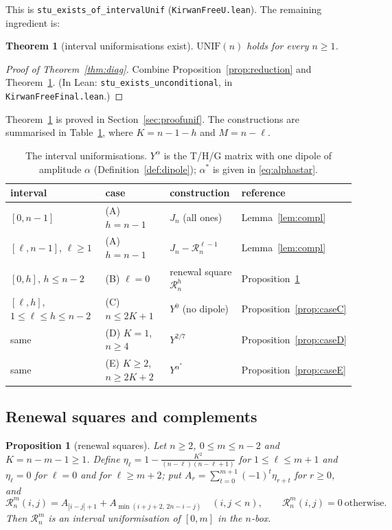 \documentclass[11pt]{amsart}
\newtheorem{mainthm}{Theorem}
\newtheorem{proposition}[lemma]{Proposition}
\theoremstyle{definition}
\theoremstyle{remark}
\numberwithin{equation}{section}
\newcommand{\cR}{\mathcal{R}}
\newcommand{\lean}[1]{\texttt{#1}}
\begin{document}
This is \lean{stu\_exists\_of\_intervalUnif} (\lean{KirwanFreeU.lean}). The remaining ingredient is:

\begin{mainthm}[interval uniformisations exist]\label{thm:unif}
$\mathrm{UNIF}(n)$ holds for every $n\ge1$.
\end{mainthm}

\begin{proof}[Proof of Theorem~\ref{thm:diag}]
Combine Proposition~\ref{prop:reduction} and Theorem~\ref{thm:unif}. (In Lean:
\lean{stu\_exists\_unconditional}, in \lean{KirwanFreeFinal.lean}.)
\end{proof}

Theorem~\ref{thm:unif} is proved in Section~\ref{sec:proofunif}. The constructions are summarised in
Table~\ref{tab:cases}, where $K=n-1-h$ and $M=n-\ell$.

\begin{table}[ht]
\centering
\begin{tabular}{llll}
\toprule
interval & case & construction & reference\\
\midrule
$[0,n-1]$ & (A) $h=n-1$ & $J_n$ (all ones) & Lemma~\ref{lem:compl}\\
$[\ell,n-1]$, $\ell\ge1$ & (A) $h=n-1$ & $J_n-\cR^{\ell-1}_n$ & Lemma~\ref{lem:compl}\\
$[0,h]$, $h\le n-2$ & (B) $\ell=0$ & renewal square $\cR^h_n$ & Proposition~\ref{prop:renewal}\\
$[\ell,h]$, $1\le\ell\le h\le n-2$ & (C) $n\le2K+1$ & $Y^{0}$ (no dipole) & Proposition~\ref{prop:caseC}\\
same & (D) $K=1$, $n\ge4$ & $Y^{2/7}$ & Proposition~\ref{prop:caseD}\\
same & (E) $K\ge2$, $n\ge2K+2$ & $Y^{\alpha^*}$ & Proposition~\ref{prop:caseE}\\
\bottomrule
\end{tabular}
\caption{The interval uniformisations. $Y^\alpha$ is the T/H/G matrix with one dipole of amplitude
$\alpha$ (Definition~\ref{def:dipole}); $\alpha^*$ is given in \eqref{eq:alphastar}.}
\label{tab:cases}
\end{table}

\subsection{Renewal squares and complements}

\begin{proposition}[renewal squares]\label{prop:renewal}
Let $n\ge2$, $0\le m\le n-2$ and $K=n-m-1\ge1$. Define $\eta_\ell=1-\frac{K^2}{(n-\ell)(n-\ell+1)}$ for
$1\le\ell\le m+1$ and $\eta_\ell=0$ for $\ell=0$ and for $\ell\ge m+2$; put
$A_r=\sum_{t=0}^{m+1}(-1)^t\eta_{r+t}$ for $r\ge0$, and
\[
  \cR^m_n(i,j)=A_{|i-j|+1}+A_{\min(i+j+2,\,2n-i-j)}\quad(i,j<n),\qquad \cR^m_n(i,j)=0\ \text{otherwise}.
\]
Then $\cR^m_n$ is an interval uniformisation of $[0,m]$ in the $n$-box.
\end{proposition}
\end{document}
